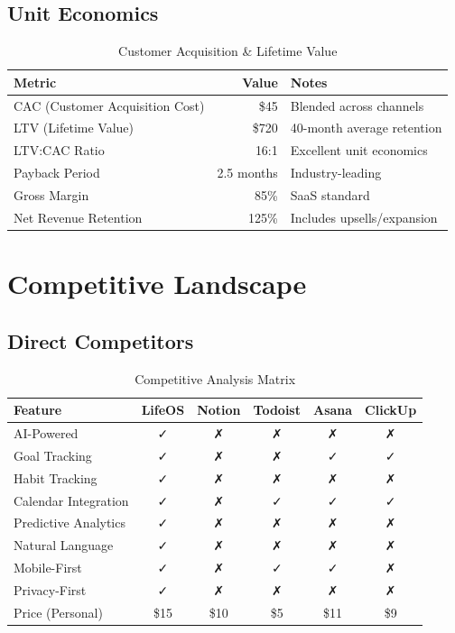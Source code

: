 \subsection{Unit Economics}

\begin{table}[H]
\centering
\caption{Customer Acquisition \& Lifetime Value}
\begin{tabular}{|l|r|p{6cm}|}
\hline
\rowcolor{lightgray}
\textbf{Metric} & \textbf{Value} & \textbf{Notes} \\
\hline
CAC (Customer Acquisition Cost) & \$45 & Blended across channels \\
\hline
LTV (Lifetime Value) & \$720 & 40-month average retention \\
\hline
LTV:CAC Ratio & 16:1 & Excellent unit economics \\
\hline
Payback Period & 2.5 months & Industry-leading \\
\hline
Gross Margin & 85\% & SaaS standard \\
\hline
Net Revenue Retention & 125\% & Includes upsells/expansion \\
\hline
\end{tabular}
\end{table}

\section{Competitive Landscape}

\subsection{Direct Competitors}

\begin{table}[H]
\centering
\caption{Competitive Analysis Matrix}
\begin{tabular}{|l|c|c|c|c|c|}
\hline
\rowcolor{lightgray}
\textbf{Feature} & \textbf{LifeOS} & \textbf{Notion} & \textbf{Todoist} & \textbf{Asana} & \textbf{ClickUp} \\
\hline
AI-Powered & ✓ & ✗ & ✗ & ✗ & ✗ \\
\hline
Goal Tracking & ✓ & ✗ & ✗ & ✓ & ✓ \\
\hline
Habit Tracking & ✓ & ✗ & ✗ & ✗ & ✗ \\
\hline
Calendar Integration & ✓ & ✗ & ✓ & ✓ & ✓ \\
\hline
Predictive Analytics & ✓ & ✗ & ✗ & ✗ & ✗ \\
\hline
Natural Language & ✓ & ✗ & ✗ & ✗ & ✗ \\
\hline
Mobile-First & ✓ & ✗ & ✓ & ✓ & ✗ \\
\hline
Privacy-First & ✓ & ✗ & ✗ & ✗ & ✗ \\
\hline
Price (Personal) & \$15 & \$10 & \$5 & \$11 & \$9 \\
\hline
\end{tabular}
\end{table}

